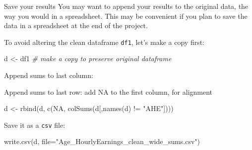 \documentclass[
  11pt,
  ignorenonframetext,
  svgnames, handout, t]{beamer}
\newenvironment{Shaded}{\begin{snugshade}}{\end{snugshade}}
\newcommand{\AttributeTok}[1]{\textcolor[rgb]{0.77,0.63,0.00}{#1}}
\newcommand{\CommentTok}[1]{\textcolor[rgb]{0.56,0.35,0.01}{\textit{#1}}}
\newcommand{\ConstantTok}[1]{\textcolor[rgb]{0.00,0.00,0.00}{#1}}
\newcommand{\FunctionTok}[1]{\textcolor[rgb]{0.00,0.00,0.00}{#1}}
\newcommand{\NormalTok}[1]{#1}
\newcommand{\OtherTok}[1]{\textcolor[rgb]{0.56,0.35,0.01}{#1}}
\newcommand{\SpecialCharTok}[1]{\textcolor[rgb]{0.00,0.00,0.00}{#1}}
\newcommand{\StringTok}[1]{\textcolor[rgb]{0.31,0.60,0.02}{#1}}
\begin{document}
\begin{frame}[fragile]{Save your results}
\protect\hypertarget{save-your-results}{}
You may want to append your results to the original data, the way you
would in a spreadsheet. This may be convenient if you plan to save the
data in a spreadsheet at the end of the project.

To avoid altering the clean dataframe \texttt{df1}, let's make a copy
first:

\footnotesize

\begin{Shaded}
\begin{Highlighting}[]
\NormalTok{d }\OtherTok{\textless{}{-}}\NormalTok{ df1  }\CommentTok{\# make a copy to preserve original dataframe}
\end{Highlighting}
\end{Shaded}

\normalsize

Append sums to last column:

\footnotesize

\begin{Shaded}
\end{Shaded}

\normalsize

Append sums to last row: add NA to the first column, for alignment

\footnotesize

\begin{Shaded}
\begin{Highlighting}[]
\NormalTok{d }\OtherTok{\textless{}{-}} \FunctionTok{rbind}\NormalTok{(d, }\FunctionTok{c}\NormalTok{(}\ConstantTok{NA}\NormalTok{, }\FunctionTok{colSums}\NormalTok{(d[,}\FunctionTok{names}\NormalTok{(d) }\SpecialCharTok{!=} \StringTok{"AHE"}\NormalTok{])))}
\end{Highlighting}
\end{Shaded}

\normalsize

Save it as a \texttt{csv} file:

\footnotesize

\begin{Shaded}
\begin{Highlighting}[]
\FunctionTok{write.csv}\NormalTok{(d, }\AttributeTok{file=}\StringTok{"Age\_HourlyEarnings\_clean\_wide\_sums.csv"}\NormalTok{)}
\end{Highlighting}
\end{Shaded}


\end{frame}
\end{document}
